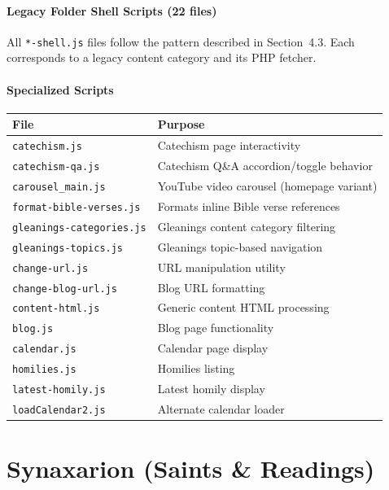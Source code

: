 \documentclass[12pt]{article}
\begin{document}
\paragraph{Legacy Folder Shell Scripts (22 files)}

All \texttt{*-shell.js} files follow the pattern described in Section~4.3. Each corresponds to a legacy content category and its PHP fetcher.

\paragraph{Specialized Scripts}

{\small
\begin{longtable}{p{4.8cm}p{7.7cm}}
\toprule
\textbf{File} & \textbf{Purpose} \\
\midrule
\texttt{catechism.js} & Catechism page interactivity \\
\texttt{catechism-qa.js} & Catechism Q\&A accordion/toggle behavior \\
\texttt{carousel\_main.js} & YouTube video carousel (homepage variant) \\
\texttt{format-bible-verses.js} & Formats inline Bible verse references \\
\texttt{gleanings-categories.js} & Gleanings content category filtering \\
\texttt{gleanings-topics.js} & Gleanings topic-based navigation \\
\texttt{change-url.js} & URL manipulation utility \\
\texttt{change-blog-url.js} & Blog URL formatting \\
\texttt{content-html.js} & Generic content HTML processing \\
\texttt{blog.js} & Blog page functionality \\
\texttt{calendar.js} & Calendar page display \\
\texttt{homilies.js} & Homilies listing \\
\texttt{latest-homily.js} & Latest homily display \\
\texttt{loadCalendar2.js} & Alternate calendar loader \\
\bottomrule
\end{longtable}
}

\section{Synaxarion (Saints \& Readings)}
\end{document}
